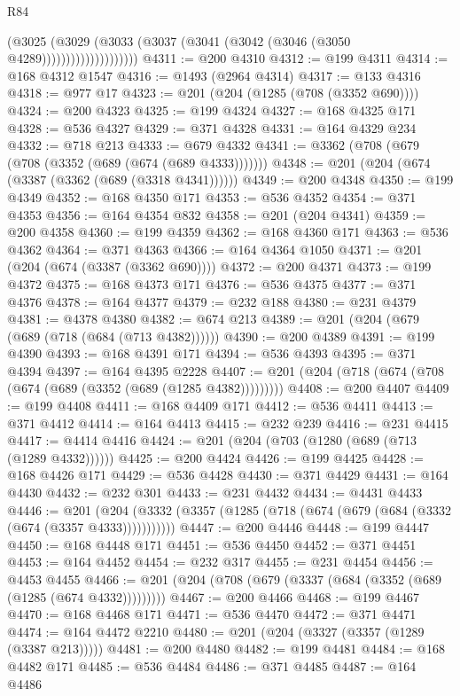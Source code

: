 \begin{lexlean}{R84}
\begin{coremodule}
                            (@3025
                              (@3029
                                (@3033 (@3037 (@3041 (@3042 (@3046 (@3050 @4289))))))))))))))))))))
@4311 := @200 @4310
@4312 := @199 @4311
@4314 := @168 @4312 @1547
@4316 := @1493 (@2964 @4314)
@4317 := @133 @4316
@4318 := @977 @17
@4323 := @201 (@204 (@1285 (@708 (@3352 @690))))
@4324 := @200 @4323
@4325 := @199 @4324
@4327 := @168 @4325 @171
@4328 := @536 @4327
@4329 := @371 @4328
@4331 := @164 @4329 @234
@4332 := @718 @213
@4333 := @679 @4332
@4341 := @3362 (@708 (@679 (@708 (@3352 (@689 (@674 (@689 @4333)))))))
@4348 := @201 (@204 (@674 (@3387 (@3362 (@689 (@3318 @4341))))))
@4349 := @200 @4348
@4350 := @199 @4349
@4352 := @168 @4350 @171
@4353 := @536 @4352
@4354 := @371 @4353
@4356 := @164 @4354 @832
@4358 := @201 (@204 @4341)
@4359 := @200 @4358
@4360 := @199 @4359
@4362 := @168 @4360 @171
@4363 := @536 @4362
@4364 := @371 @4363
@4366 := @164 @4364 @1050
@4371 := @201 (@204 (@674 (@3387 (@3362 @690))))
@4372 := @200 @4371
@4373 := @199 @4372
@4375 := @168 @4373 @171
@4376 := @536 @4375
@4377 := @371 @4376
@4378 := @164 @4377
@4379 := @232 @188
@4380 := @231 @4379
@4381 := @4378 @4380
@4382 := @674 @213
@4389 := @201 (@204 (@679 (@689 (@718 (@684 (@713 @4382))))))
@4390 := @200 @4389
@4391 := @199 @4390
@4393 := @168 @4391 @171
@4394 := @536 @4393
@4395 := @371 @4394
@4397 := @164 @4395 @2228
@4407 := @201 (@204 (@718 (@674 (@708 (@674 (@689 (@3352 (@689 (@1285 @4382)))))))))
@4408 := @200 @4407
@4409 := @199 @4408
@4411 := @168 @4409 @171
@4412 := @536 @4411
@4413 := @371 @4412
@4414 := @164 @4413
@4415 := @232 @239
@4416 := @231 @4415
@4417 := @4414 @4416
@4424 := @201 (@204 (@703 (@1280 (@689 (@713 (@1289 @4332))))))
@4425 := @200 @4424
@4426 := @199 @4425
@4428 := @168 @4426 @171
@4429 := @536 @4428
@4430 := @371 @4429
@4431 := @164 @4430
@4432 := @232 @301
@4433 := @231 @4432
@4434 := @4431 @4433
@4446 := @201
    (@204 (@3332 (@3357 (@1285 (@718 (@674 (@679 (@684 (@3332 (@674 (@3357 @4333)))))))))))
@4447 := @200 @4446
@4448 := @199 @4447
@4450 := @168 @4448 @171
@4451 := @536 @4450
@4452 := @371 @4451
@4453 := @164 @4452
@4454 := @232 @317
@4455 := @231 @4454
@4456 := @4453 @4455
@4466 := @201 (@204 (@708 (@679 (@3337 (@684 (@3352 (@689 (@1285 (@674 @4332)))))))))
@4467 := @200 @4466
@4468 := @199 @4467
@4470 := @168 @4468 @171
@4471 := @536 @4470
@4472 := @371 @4471
@4474 := @164 @4472 @2210
@4480 := @201 (@204 (@3327 (@3357 (@1289 (@3387 @213)))))
@4481 := @200 @4480
@4482 := @199 @4481
@4484 := @168 @4482 @171
@4485 := @536 @4484
@4486 := @371 @4485
@4487 := @164 @4486

\end{coremodule}
\end{lexlean}

